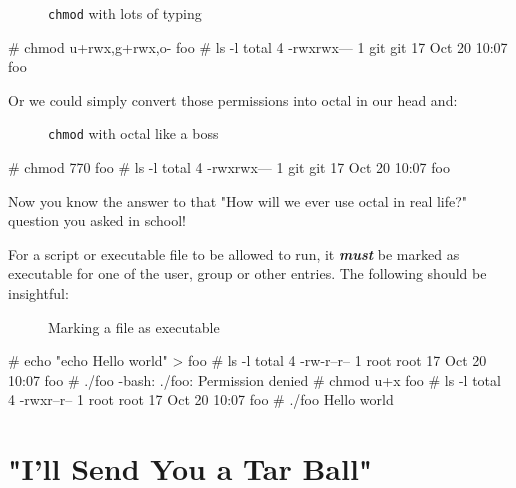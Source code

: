 \documentclass[10pt,american,]{book}
\newenvironment{Shaded}{\begin{snugshade}}{\end{snugshade}}
\newcommand{\KeywordTok}[1]{\textcolor[rgb]{0.13,0.29,0.53}{\textbf{{#1}}}}
\newcommand{\CommentTok}[1]{\textcolor[rgb]{0.56,0.35,0.01}{\textit{{#1}}}}
\newcommand{\NormalTok}[1]{{#1}}
\numberwithin{figure}{chapter}
\DeclareRobustCommand{\drcap}[1]{\begin{figure}[H]\caption{#1}\end{figure}}
\renewcommand{\KeywordTok}[1]{{#1}}
\renewcommand{\CommentTok}[1]{{#1}}
\renewcommand{\NormalTok}[1]{{#1}}
\begin{document}
\drcap{\texttt{chmod} with lots of typing}

\begin{Shaded}
\begin{Highlighting}[]
\CommentTok{# chmod u+rwx,g+rwx,o- foo}
\CommentTok{# ls -l}
\KeywordTok{total} \NormalTok{4}
\KeywordTok{-rwxrwx---} \NormalTok{1 git git 17 Oct 20 10:07 foo}
\end{Highlighting}
\end{Shaded}

Or we could simply convert those permissions into octal in our head and:

\drcap{\texttt{chmod} with octal like a boss}

\begin{Shaded}
\begin{Highlighting}[]
\CommentTok{# chmod 770 foo}
\CommentTok{# ls -l}
\KeywordTok{total} \NormalTok{4}
\KeywordTok{-rwxrwx---} \NormalTok{1 git git 17 Oct 20 10:07 foo}
\end{Highlighting}
\end{Shaded}

Now you know the answer to that "How will we ever use octal in real
life?" question you asked in school!

For a script or executable file to be allowed to run, it
\textbf{\emph{must}} be marked as executable for one of the user, group
or other entries. The following should be insightful:

\drcap{Marking a file as executable}

\begin{Shaded}
\begin{Highlighting}[]
\CommentTok{# echo "echo Hello world" > foo}
\CommentTok{# ls -l}
\KeywordTok{total} \NormalTok{4}
\KeywordTok{-rw-r--r--} \NormalTok{1 root root 17 Oct 20 10:07 foo}
\CommentTok{# ./foo}
\KeywordTok{-bash}\NormalTok{: ./foo: Permission denied}
\CommentTok{# chmod u+x foo}
\CommentTok{# ls -l}
\KeywordTok{total} \NormalTok{4}
\KeywordTok{-rwxr--r--} \NormalTok{1 root root 17 Oct 20 10:07 foo}
\CommentTok{# ./foo}
\KeywordTok{Hello} \NormalTok{world}
\end{Highlighting}
\end{Shaded}

\section*{"I'll Send You a Tar Ball"}\label{ill-send-you-a-tar-ball}
\end{document}
